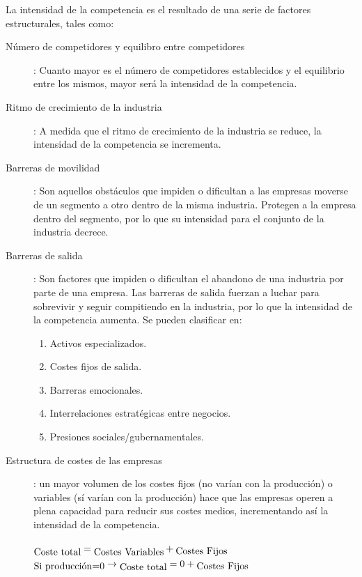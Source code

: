 \documentclass[10pt,a4paper,spanish]{report}
\begin{document}
            La intensidad de la competencia es el resultado de una serie de factores estructurales, tales como:
            \begin{description}
                  \item[Número de competidores y equilibro entre competidores]: Cuanto mayor es el número de competidores establecidos y el equilibrio entre los mismos, mayor será la intensidad de la competencia.
                  \item[Ritmo de crecimiento de la industria]: A medida que el ritmo de crecimiento de la industria se reduce, la intensidad de la competencia se incrementa.
                  \item[Barreras de movilidad]: Son aquellos obstáculos que impiden o dificultan a las empresas moverse de un segmento a otro dentro de la misma industria. Protegen a la empresa dentro del segmento, por lo que su intensidad para el conjunto de la industria decrece.
                  \item[Barreras de salida]: Son factores que impiden o dificultan el abandono de una industria por parte de una empresa. Las barreras de salida fuerzan a luchar para sobrevivir y seguir compitiendo en la industria, por lo que la intensidad de la competencia aumenta. Se pueden clasificar en:
                  \begin{enumerate}
                        \item Activos especializados.
                        \item Costes fijos de salida.
                        \item Barreras emocionales.
                        \item Interrelaciones estratégicas entre negocios.
                        \item Presiones sociales/gubernamentales.
                  \end{enumerate}
                  \item[Estructura de costes de las empresas]: un mayor volumen de los costes fijos (no varían con la producción) o variables (sí varían con la producción) hace que las empresas operen a plena capacidad para reducir sus costes medios, incrementando así la intensidad de la competencia. \\
                  \begin{center}
                        $\txt{Coste total}=\txt{Costes Variables}+\txt{Costes Fijos}$ \\
                        $\txt{Si producción=0} \rightarrow \txt{Coste total}=0+\txt{Costes Fijos}$

\end{center}
\end{description}
\end{document}
